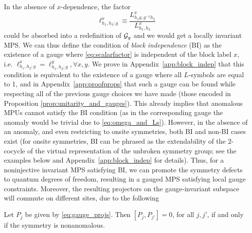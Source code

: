 \documentclass[reprint,
superscriptaddress,
amsmath,amssymb,
notitlepage,
aps,
prb,
10pt, 
tightenlines
]{revtex4-2}
\begin{document}
In the absence of $x$-dependence, the factor 
\begin{equation}
    \ell_{h_1,h_2;g}^x\equiv\dfrac{L^x_{h_1g,g^{-1}h_2}}{L^x_{h_1,h_2}}
\label{eq:scalarfactor}
\end{equation} could be absorbed into a redefinition of $\mathcal{G}_g$ and we would get a locally invariant MPS. We can thus define the condition of \textit{block independence} (BI) as the existence of a gauge where \eqref{eq:scalarfactor} is independent of the block label $x$, i.e. $\ell_{h_1,h_2;g}^x=\ell_{h_1,h_2;g}^y, \forall x,y$. We prove in Appendix~\ref{app:block_indep} that this condition is equivalent to the existence of a gauge where all $L$-symbols are equal to 1, and in Appendix~\ref{app:proofprops} that such a gauge can be found while respecting all of the previous gauge choices we have made (those encoded in Proposition \ref{prop:unitarity_and_gauges}). This already implies that anomalous MPUs cannot satisfy the BI condition (as in the corresponding gauge the anomaly would be trivial due to \eqref{eq:omega_and_Ls}). However, in the absence of an anomaly, and even restricting to onsite symmetries, both BI and non-BI cases exist (for onsite symmetries, BI can be phrased as the extendability of the $2$-cocycle of the virtual representation of the unbroken symmetry group; see the examples below and Appendix~\ref{app:block_indep} for details). Thus, for a noninjective invariant MPS satisfying BI, we can promote the symmetry defects to quantum degrees of freedom, resulting in a gauged MPS satisfying local gauge constraints. Moreover, the resulting projectors on the gauge-invariant subspace will commute on different sites, due to the following
\begin{proposition}
Let $P_j$ be given by \eqref{eq:gauge_projs}. Then $[P_j, P_{j'}]=0$, for all $j, j'$, if and only if the symmetry is nonanomalous.
    \label{prop:comm_proj}
\end{proposition}
\end{document}
